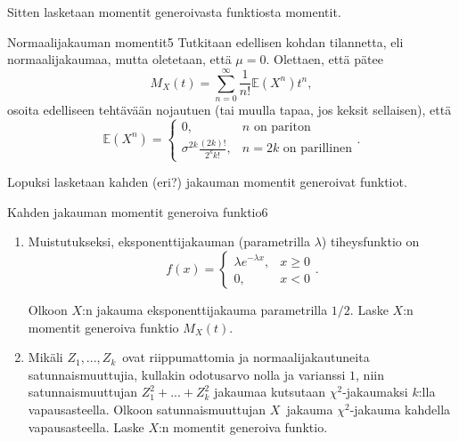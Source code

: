 \documentclass[11pt,a4paper]{amsart}
\newcommand{\E}{\mathbb{E}}
\newcommand{\1}{\mathbf{1}}
\begin{document}
Sitten lasketaan momentit generoivasta funktiosta momentit.

\begin{Exercises}{Normaalijakauman momentit}{5}
Tutkitaan edellisen kohdan tilannetta, eli normaalijakaumaa, mutta oletetaan, että $\mu=0$. Olettaen, että pätee
\[
M_X(t)=\sum_{n=0}^\infty \frac{1}{n!}\E (X^n) t^n,
\]
osoita edelliseen tehtävään nojautuen (tai muulla tapaa, jos keksit sellaisen), että 
\[
\E (X^n)=\begin{cases}
0, & n \text{ on pariton}\\
\sigma^{2k}\frac{(2k)!}{2^k k!}, & n=2k \text{ on parillinen}
\end{cases}.
\]

\end{Exercises}

Lopuksi lasketaan kahden (eri?) jakauman momentit generoivat funktiot.

\begin{Exercises}{Kahden jakauman momentit generoiva funktio}{6}
\begin{enumerate}
\item Muistutukseksi, eksponenttijakauman (parametrilla $\lambda$) tiheysfunktio on 
\[
f(x)=\begin{cases}
\lambda e^{-\lambda x}, & x\geq 0\\
0, & x<0
\end{cases}.
\]

Olkoon $X$:n jakauma eksponenttijakauma parametrilla $1/2$. Laske $X$:n momentit generoiva funktio $M_X(t)$. 
\item Mikäli $Z_1,...,Z_k$ ovat riippumattomia ja normaalijakautuneita satunnaismuuttujia, kullakin odotusarvo nolla ja varianssi $1$, niin satunnaismuuttujan $Z_1^2+...+Z_k^2$ jakaumaa kutsutaan $\chi^2$-jakaumaksi $k$:lla vapausasteella. Olkoon satunnaismuuttujan $X$ jakauma $\chi^2$-jakauma kahdella vapausasteella. Laske $X$:n momentit generoiva funktio.

\end{enumerate}
\end{Exercises}
\end{document}
